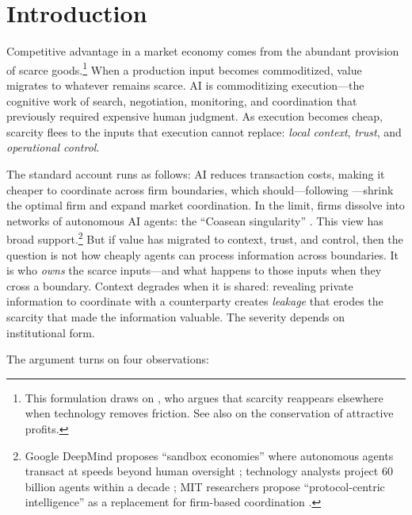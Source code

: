 \documentclass[12pt]{article}
\theoremstyle{definition}
\begin{document}
\newpage
\tableofcontents
\newpage

\section{Introduction}

Competitive advantage in a market economy comes from the abundant provision of scarce goods.\footnote{This formulation draws on \citet{danco2017}, who argues that scarcity reappears elsewhere when technology removes friction. See also \citet{christensen1997} on the conservation of attractive profits.} When a production input becomes commoditized, value migrates to whatever remains scarce. AI is commoditizing execution---the cognitive work of search, negotiation, monitoring, and coordination that previously required expensive human judgment. As execution becomes cheap, scarcity flees to the inputs that execution cannot replace: \textit{local context}, \textit{trust}, and \textit{operational control}.

The standard account runs as follows: AI reduces transaction costs, making it cheaper to coordinate across firm boundaries, which should---following \citet{coase1937}---shrink the optimal firm and expand market coordination. In the limit, firms dissolve into networks of autonomous AI agents: the ``Coasean singularity'' \citep{shahidi2025}. This view has broad support.\footnote{Google DeepMind proposes ``sandbox economies'' where autonomous agents transact at speeds beyond human oversight \citep{tomasev2025}; technology analysts project 60 billion agents within a decade \citep{azhar2024}; MIT researchers propose ``protocol-centric intelligence'' as a replacement for firm-based coordination \citep{chopra2024}.} But if value has migrated to context, trust, and control, then the question is not how cheaply agents can process information across boundaries. It is who \textit{owns} the scarce inputs---and what happens to those inputs when they cross a boundary. Context degrades when it is shared: revealing private information to coordinate with a counterparty creates \textit{leakage} that erodes the scarcity that made the information valuable. The severity depends on institutional form.

The argument turns on four observations:
\end{document}
